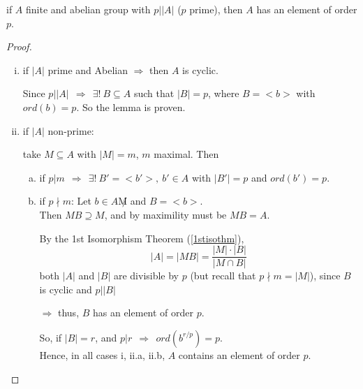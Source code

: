 \documentclass{article}
\theoremstyle{definition}
\newenvironment{lemma}[1]
{\renewcommand\theinnerlemma{#1}\innerlemma}
{\endinnerlemma}
\begin{document}
\begin{lemma}{14.14} \label{14.14}
  if $A$ finite and abelian group with $p \biggr\vert |A|$ ($p$ prime), then $A$ has an element of order $p$.
\end{lemma}
\begin{proof}
  \begin{enumerate}[i.]
    \item if $|A|$ prime and Abelian $\Longrightarrow$ then $A$ is cyclic.

      Since $p \vert |A| ~~ \Longrightarrow ~~ \exists! ~ B \subseteq A$ such that $|B|=p$, where $B = <b>$ with $ord(b)=p$. So the lemma is proven.

    \item if $|A|$ non-prime:

      take $M \subseteq A$ with $|M|=m$, $m$ maximal. Then

      \begin{enumerate}[a.]
	\item if $p|m ~~ \Longrightarrow ~~ \exists! ~ B'=<b'>,~ b' \in A$ with $|B'|=p$ and $ord(b')=p$.
	\item if $p \nmid m$:
	  Let $b \in A \not M$ and $B=<b>$.\\
	  Then $MB \supseteq M$, and by maximility must be $MB=A$.

	  By the 1st Isomorphism Theorem (\ref{1stisothm}),
	  $$|A| = |MB| = \frac{|M| \cdot |B|}{|M \cap B|}$$
	  both $|A|$ and $|B|$ are divisible by $p$ (but recall that $p \nmid m=|M|$), since $B$ is cyclic and $p \vert |B|$

	  $\Longrightarrow$ thus, $B$ has an element of order $p$.
	  
	  So, if $|B|=r$, and $p|r ~~ \Longrightarrow~~ ord(b^{r/p}) = p$.\\

	  Hence, in all cases i, ii.a, ii.b, $A$ contains an element of order $p$.
      \end{enumerate}
  \end{enumerate}
\end{proof}
\end{document}
